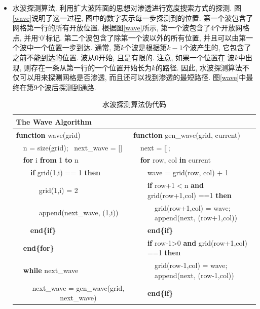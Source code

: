 \documentclass[11pt,a4paper,boxed]{caspset}
\begin{document}
\begin{itemize}
\item 水波探测算法. 利用扩大波阵面的思想对渗透进行宽度搜索方式的探测. 图\ref{wave}说明了这一过程, 图中的数字表示每一步探测到的位置. 第一个波包含了网格第一行的所有开放位置. 根据图\ref{wave}所示, 第一个波包含了4个开放网格点, 并用`0'标记. 第二个波包含了除第一个波以外的所有位置, 并且可以由第一个波中一个位置一步到达. 通常, 第$k$个波是根据第$k-1$个波产生的, 它包含了之前不能到达的位置. 波从0开始, 且是有限的. 注意, 如果一个位置在 波$k$中出现, 则存在一条从第一行的一个位置开始长为$k$的路径. 因此, 水波探测算法不仅可以用来探测网格是否渗透, 而且还可以找到渗透的最短路径.
    图\ref{wave}中最终在第9个波后探测到通路.
\begin{table}[!htb]
\centering
\caption{\label{waveAlgorithm}水波探测算法伪代码}
{\tiny
\begin{tabular}{|lllllllll}
\hline
\multicolumn{9}{|l|}{The Wave Algorithm} \\
\hline
\multicolumn{5}{|l|}{\textbf{function} wave(grid)} & \multicolumn{4}{l|}{\textbf{function} gen\_wave(grid, current)} \\
 & \multicolumn{4}{l|}{n = size(grid); {~}next\_wave = []} &  & \multicolumn{3}{l|}{next  = [];} \\
 & \multicolumn{4}{l|}{\textbf{for} i \textbf{from} 1 \textbf{to} n} &  & \multicolumn{3}{l|}{\textbf{for} row, col \textbf{in} current} \\
 &  & \multicolumn{3}{l|}{\textbf{if} grid(1,i) == 1 \textbf{then}} &  &  & \multicolumn{2}{l|}{wave = grid(row, col) + 1} \\
 &  &  & \multicolumn{2}{l|}{grid(1,i) = 2} &  &  & \multicolumn{2}{l|}{\textbf{if} row+1$<$n \textbf{and} grid(row+1,col) ==1 \textbf{then}} \\
 &  &  & \multicolumn{2}{l|}{append(next\_wave, (1,i))} &  &  &  & \multicolumn{1}{l|}{grid(row+1,col) = wave; append(next, (row+1,col))} \\
 &  & \multicolumn{3}{l|}{\textbf{end\{if\}}} &  &  & \multicolumn{2}{l|}{\textbf{end\{if\}}} \\
 & \multicolumn{4}{l|}{\textbf{end\{for\}}} &  &  & \multicolumn{2}{l|}{\textbf{if} row-1>0 \textbf{and} grid(row+1,col) ==1 \textbf{then}} \\
 & \multicolumn{4}{l|}{\textbf{while} next\_wave} &  &  &  & \multicolumn{1}{l|}{grid(row-1,col) = wave; append(next, (row-1,col))} \\
 &  & \multicolumn{3}{c|}{next\_wave = gen\_wave(grid, next\_wave)} &  &  & \multicolumn{2}{l|}{\textbf{end\{if\}}} \\

\end{tabular}}
\end{table}
\end{itemize}
\end{document}
